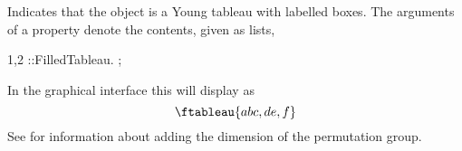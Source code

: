 
Indicates that the object is a Young
  tableau with labelled boxes. The arguments
  of a  property denote the contents, given as lists,
\begin{screen}{1,2}
\ftab{#}::FilledTableau.
;
\end{screen}
In the graphical interface this will display as
\begin{equation*}
\ftableau{a b c, d e, f}
\end{equation*}
See  for information about adding the dimension of
the permutation group.


